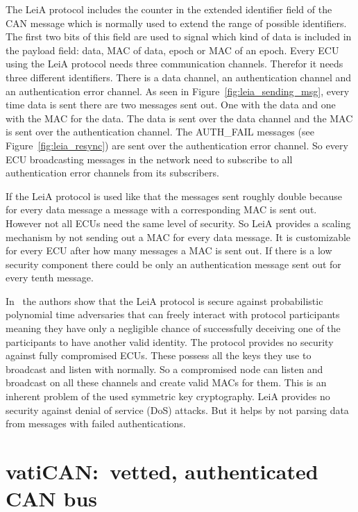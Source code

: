 The LeiA protocol includes the counter in the extended identifier field of the
CAN message which is normally used to extend the range of possible identifiers.
The first two bits of this field are used to signal which kind of data is
included in the payload field: data, MAC of data, epoch or MAC of an epoch.
Every ECU using the LeiA protocol needs three communication channels. Therefor
it needs three different identifiers. There is a data channel, an authentication
channel and an authentication error channel. As seen in
Figure~\ref{fig:leia_sending_msg}, every time data is sent there are two
messages sent out. One with the data and one with the MAC for the data. The data
is sent over the data channel and the MAC is sent over the authentication
channel. The AUTH\_FAIL messages (see Figure~\ref{fig:leia_resync}) are sent
over the authentication error channel. So every ECU broadcasting messages in the
network need to subscribe to all authentication error channels from its
subscribers.

If the LeiA protocol is used like that the messages sent roughly double because
for every data message a message with a corresponding MAC is sent out. However
not all ECUs need the same level of security. So LeiA provides a scaling
mechanism by not sending out a MAC for every data message. It
is customizable for every ECU after how many messages a MAC is sent out. If there is a low
security component there could be only an authentication message sent out for
every tenth message.

In~\cite{Radu2016} the authors show that the LeiA protocol is secure against
probabilistic polynomial time adversaries that can freely interact with protocol
participants meaning they have only a negligible chance of successfully
deceiving one of the participants to have another valid identity. The protocol
provides no security against fully compromised ECUs. These possess all the keys
they use to broadcast and listen with normally. So a compromised node can listen
and broadcast on all these channels and create valid MACs for them. This is an
inherent problem of the used symmetric key cryptography. LeiA provides no
security against denial of service (DoS) attacks. But it helps by not parsing
data from messages with failed authentications.

\section{vatiCAN:\ vetted, authenticated CAN bus}\label{sec:vatiCAN}

